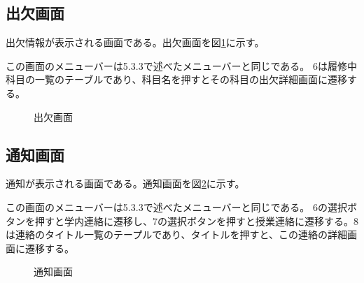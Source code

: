 \documentclass[a4j,12pt,onecolumn,oneside,titlepage,openany,final]{jreport}
\begin{document}
\subsection{出欠画面}
出欠情報が表示される画面である。出欠画面を図\ref{shuke}に示す。

この画面のメニューバーは5.3.3で述べたメニューバーと同じである。
6は履修中科目の一覧のテーブルであり、科目名を押すとその科目の出欠詳細画面に遷移する。

\begin{figure}[htbp]
  \centering %
  \caption{出欠画面}\label{shuke}
\end{figure}

\subsection{通知画面}
通知が表示される画面である。通知画面を図\ref{tuchi}に示す。

この画面のメニューバーは5.3.3で述べたメニューバーと同じである。
6の選択ボタンを押すと学内連絡に遷移し、7の選択ボタンを押すと授業連絡に遷移する。8は連絡のタイトル一覧のテープルであり、タイトルを押すと、この連絡の詳細画面に遷移する。


\begin{figure}[htbp]
  \centering %
  \caption{通知画面}\label{tuchi}
\end{figure}
\end{document}
